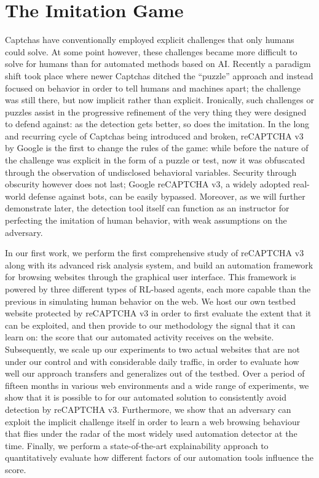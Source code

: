 \section{The Imitation Game}

Captchas have conventionally employed explicit challenges that only humans could solve.
At some point however, these challenges became more difficult to solve for humans than for automated methods based on \gls{AI}.
Recently a paradigm shift took place where newer Captchas ditched the ``puzzle'' approach and instead focused on behavior in order to tell humans and machines apart; the challenge was still there, but now implicit rather than explicit.
Ironically, such challenges or puzzles assist in the progressive refinement of the very thing they were designed to defend against: as the detection gets better, so does the imitation.
In the long and recurring cycle of Captchas being introduced and broken, reCAPTCHA v3 by Google is the first to change the rules of the game: while before the nature of the challenge was explicit in the form of a puzzle or test, now it was obfuscated through the observation of undisclosed behavioral variables.
Security through obscurity however does not last; Google reCAPTCHA v3, a widely adopted real-world defense against bots, can be easily bypassed.
Moreover, as we will further demonstrate later, the detection tool itself can function as an instructor for perfecting the imitation of human behavior, with weak assumptions on the adversary.

In our first work, we perform the first comprehensive study of reCAPTCHA v3 along with its advanced risk analysis system, and build an automation framework for browsing websites through the graphical user interface.
This framework is powered by three different types of RL-based agents, each more capable than the previous in simulating human behavior on the web.
We host our own testbed website protected by reCAPTCHA v3 in order to first evaluate the extent that it can be exploited, and then provide to our methodology the signal that it can learn on: the score that our automated activity receives on the website.
Subsequently, we scale up our experiments to two actual websites that are not under our control and with considerable daily traffic, in order to evaluate how well our approach transfers and generalizes out of the testbed.
Over a period of fifteen months in various web environments and a wide range of experiments, we show that it is possible to for our automated solution to consistently avoid detection by reCAPTCHA v3.
Furthermore, we show that an adversary can exploit the implicit challenge itself in order to learn a web browsing behaviour that flies under the radar of the most widely used automation detector at the time.
Finally, we perform a state-of-the-art explainability approach to quantitatively evaluate how different factors of our automation tools influence the score.


